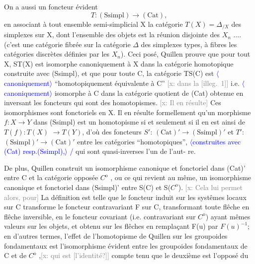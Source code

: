 \documentclass[11pt]{article}
\newcommand{\scanpage}[1]{\par\bigskip\noindent{\small\sffamily[scan #1]}\par}
\newcommand{\mspage}[1]{{\small\sffamily[p.\,#1]}}
\newcommand{\hand}[1]{\textcolor{blue}{#1}}
\newcommand{\inserted}[2][]{\textcolor{blue}{$\langle$#2$\rangle$}}
\newcommand{\xout}[1]{\textcolor{gray}{[\textsf{x:} #1]}}
\newcommand{\unsure}[1]{[#1?]}
\newcommand{\illegible}[1]{[\textsf{illeg.\ #1}]}
\begin{document}
\mspage{32}

\clearpage
\scanpage{162-5/33}
On a aussi un foncteur évident
\[ T: (\mathrm{Ssimpl}) \longrightarrow (\mathrm{Cat}) , \]
en associant à tout ensemble semi-simplicial X la catégorie $T(X) = \Delta_{/X}$
des simplexes sur X, dont l'ensemble des objets est la réunion disjointe
des $X_n$ .... (c'est une catégorie fibrée sur la catégorie $\Delta$ des simplexes
types, à fibres les catégories discrètes définies par les $X_n$). Ceci posé,
Quillen prouve que pour tout X, ST(X) est isomorphe canoniquement à X dans
la catégorie homotopique construite avec (Ssimpl), et que pour toute C,
la catégorie TS(C) est \inserted[typed]{canoniquement} ``homotopiquement équivalente à C'' \xout{dans la \illegible{1}} i.e.
\inserted[typed]{canoniquement} isomorphe à C dans la catégorie quotient de (Cat) obtenue en inversant les
foncteurs qui sont des homotopismes. \xout{Il en résulte} Ces isomorphismes sont
fonctoriels en X. Il en résulte formellement qu'un morphisme $f:X\to Y$ dans
(Ssimpl) est un homotopisme si et seulement si il en est ainsi de $T(f):T(X)$
$\to T(Y)$, d'où des foncteurs $S'$: $(\mathrm{Cat})' \longrightarrow (\mathrm{Ssimpl})'$ et $T'$:$(\mathrm{Ssimpl})'\longrightarrow(\mathrm{Cat})'$
entre les catégories ``homotopiques'', \inserted[typed]{construites avec (Cat) resp.(Ssimpl),} \hand{/} qui sont quasi-inverses l'un de l'aut-%
re.

De plus, Quillen construit un isomorphisme canonique et fonctoriel
dans (Cat)' entre C et la catégorie opposée $C^{\mathrm{o}}$ , ou ce qui revient au
même, un isomorphisme canonique et fonctoriel dans (Ssimpl)' entre S(C) et
S($C^{\mathrm{o}}$). \xout{Cela lui permet alors, pour} La définition est telle que le
foncteur induit sur les systêmes locaux sur C transforme le foncteur
contravariant F sur C, transformant toute flêche en flêche inversible, en
le foncteur covariant (i.e. contravariant sur $C^{\mathrm{o}}$) ayant mêmes valeurs sur
les objets, et obtenu sur les flêches en remplaçant F(u) par $F(u)^{-1}$; en
d'autres termes, l'effet de l'homotopisme de Quillen sur les groupoides
fondamentaux est l'isomorphisme évident entre les groupoides fondamentaux
de C et de $C^{\mathrm{o}}$ ,\xout{qui est \unsure{l'identité}} compte tenu que le deuxième est l'opposé du
\end{document}
